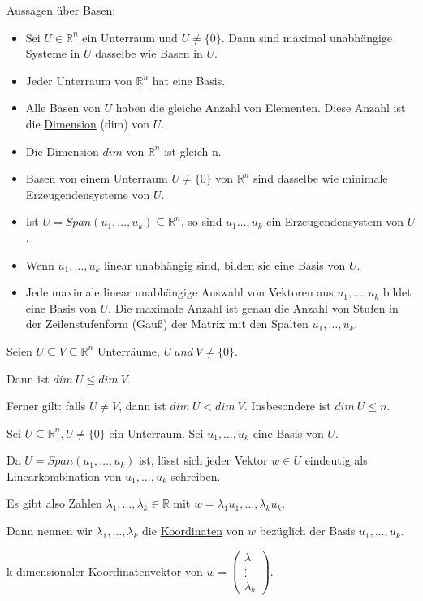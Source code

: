 \documentclass{mg2}
\begin{document}
Aussagen über Basen:
\begin{itemize}
\item Sei $U \in \mathbb{R}^n$ ein Unterraum und $U \neq \{0\}$. Dann sind maximal unabhängige Systeme in $U$ dasselbe wie Basen in $U$.
\item Jeder Unterraum von $\mathbb{R}^n$ hat eine Basis.
\item Alle Basen von $U$ haben die gleiche Anzahl von Elementen. Diese Anzahl ist die \underline{Dimension} (dim) von $U$.
\item Die Dimension $dim$ von $\mathbb{R}^n$ ist gleich n.
\item Basen von einem Unterraum $U \neq \{0\}$ von $\mathbb{R}^n$ sind dasselbe wie minimale Erzeugendensysteme von $U$.
\item Ist $U = Span(u_1,\dots,u_k) \subseteq \mathbb{R}^n$, so sind $u_1\dots,u_k$ ein Erzeugendensystem von $U$.
\item Wenn $u_1, \dots, u_k$ linear unabhängig sind, bilden sie eine Basis von $U$.
\item Jede maximale linear unabhängige Auswahl von Vektoren aus $u_1,\dots,u_k$ bildet eine Basis von $U$. Die maximale Anzahl ist genau die Anzahl von Stufen in der Zeilenstufenform (Gauß) der Matrix mit den Spalten $u_1,\dots,u_k$.
\end{itemize}

\begin{beobachtung}
Seien $U \subseteq V \subseteq \mathbb{R}^n$ Unterräume, $U~und~V \neq \{0\}$.

Dann ist $dim~U \leq dim~V$.

Ferner gilt: falls $U \neq V$, dann ist $dim~U < dim~V$. Insbesondere ist $dim~U \leq n$.
\end{beobachtung}

\begin{definition}
Sei $U \subseteq \mathbb{R}^n, U \neq \{0\}$ ein Unterraum. Sei $u_1,\dots,u_k$ eine Basis von $U$.

Da $U = Span(u_1,\dots,u_k)$ ist, lässt sich jeder Vektor $w \in U$ eindeutig als Linearkombination von $u_1,\dots,u_k$ schreiben.

Es gibt also Zahlen $\lambda_1,\dots,\lambda_k \in \mathbb{R}$ mit $w = \lambda_1 u_1,\dots,\lambda_k u_k$.

Dann nennen wir $\lambda_1,\dots,\lambda_k$ die \underline{Koordinaten} von $w$ bezüglich der Basis $u_1,\dots,u_k$.

 \underline{k-dimensionaler Koordinatenvektor} von $w = \begin{pmatrix}\lambda_1\\\vdots\\\lambda_k\end{pmatrix}$.
\end{definition}
\end{document}
